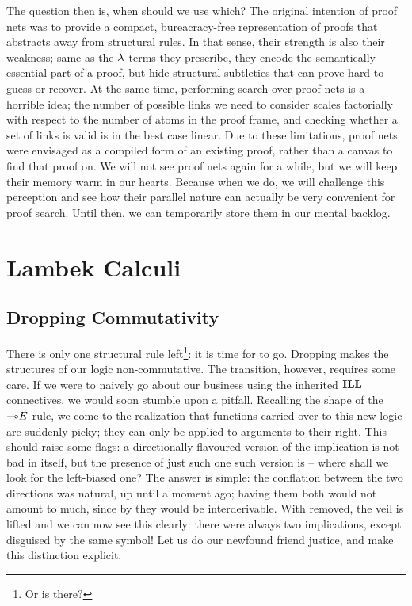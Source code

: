The question then is, when should we use which?
The original intention of proof nets was to provide a compact, bureacracy-free representation of proofs that abstracts away from structural rules.
In that sense, their strength is also their weakness; same as the $\mathnormal{\lambda}$-terms they prescribe, they encode the semantically essential part of a proof, but hide structural subtleties that can prove hard to guess or recover.
At the same time, performing search over proof nets is a horrible idea; the number of possible links we need to consider scales factorially with respect to the number of atoms in the proof frame, and checking whether a set of links is valid is in the best case linear.
Due to these limitations, proof nets were envisaged as a compiled form of an existing proof, rather than a canvas to find that proof on.
We will not see proof nets again for a while, but we will keep their memory warm in our hearts.
Because when we do, we will challenge this perception and see how their parallel nature can actually be very convenient for proof search.
Until then, we can temporarily store them in our mental backlog. 


\section{Lambek Calculi}\label{section:lambek_calculi}
\subsection{Dropping Commutativity}
There is only one structural rule left\footnote{Or is there?}: it is time for \Exchange{} to go.
Dropping \Exchange{} makes the structures of our logic non-commutative.
The transition, however, requires some care.
If we were to naively go about our business using the inherited $\textbf{ILL}$ connectives, we would soon stumble upon a pitfall.
Recalling the shape of the $\li E$ rule, we come to the realization that functions carried over to this new logic are suddenly picky; they can only be applied to arguments to their right.
This should raise some flags: a directionally flavoured version of the implication is not bad in itself, but the presence of just such one such version is --  where shall we look for the left-biased one?
The answer is simple: the conflation between the two directions was natural, up until a moment ago; having them both would not amount to much, since by \Exchange{} they would be interderivable.
With \Exchange{} removed, the veil is lifted and we can now see this clearly: there were always two implications, except disguised by the same symbol!
Let us do our newfound friend justice, and make this distinction explicit.

